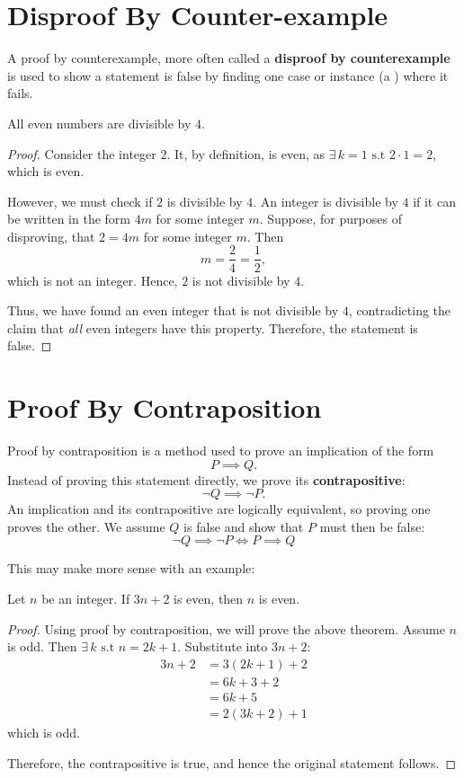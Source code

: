 \section{Disproof By Counter-example}
A proof by counterexample, more often called a \textbf{disproof by counterexample} is used to show a statement is false by finding one case or instance (a ) where it fails.

\begin{theorem}
    All even numbers are divisible by $4$.
\end{theorem}
\begin{proof}
    Consider the integer $2$. It, by definition, is even, as $\exists \,  k=1 \text{ s.t } 2\cdot 1 = 2$, which is even.

    However, we must check if $2$ is divisible by $4$. An integer is divisible by $4$ if it can be written in the form $4m$ for some integer $m$. Suppose, for purposes of disproving, that $2 = 4m$ for some integer $m$. Then
    \[
        m = \frac{2}{4} = \frac{1}{2},
    \]
    which is not an integer. Hence, $2$ is not divisible by $4$.

    Thus, we have found an even integer that is not divisible by $4$, contradicting the claim that \emph{all} even integers have this property. Therefore, the statement is false.
\end{proof}
\section{Proof By Contraposition}
Proof by contraposition is a method used to prove an implication of the form
\[
    P \implies Q.
\]
Instead of proving this statement directly, we prove its \textbf{contrapositive}:
\[
    \neg Q \implies \neg P.
\]
An implication and its contrapositive are logically equivalent, so proving one proves the other. We assume $Q$ is false and show that $P$ must then be false:
$$\neg Q \implies \neg P \iff P \implies Q$$

This may make more sense with an example:
\begin{theorem}
    Let $n$ be an integer. If $3n+2$ is even, then $n$ is even.
\end{theorem}
\begin{proof}
    Using proof by contraposition, we will prove the above theorem. Assume $n$ is odd. Then $\exists \, k \text{ s.t } n=2k+1$. Substitute into $3n+2$:
    \begin{align*}
        3n + 2 & = 3(2k+1) + 2   \\
               & = 6k + 3 + 2    \\
               & = 6k + 5        \\
               & = 2(3k + 2) + 1
    \end{align*}
    which is odd.

    Therefore, the contrapositive is true, and hence the original statement follows.
\end{proof}
